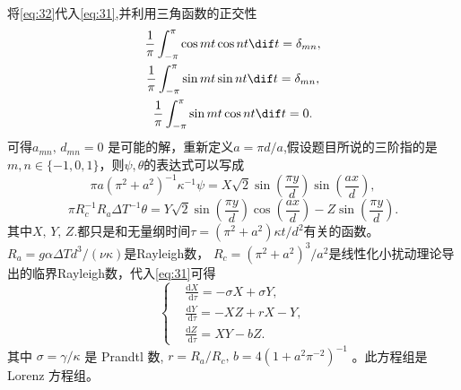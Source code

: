\documentclass[12pt]{ctexart}
\begin{document}
将\cref{eq:32}代入\cref{eq:31},并利用三角函数的正交性
\begin{gather}
	\frac{1}{\pi} \int^\pi_{-\pi} \cos mt \cos nt \dif t = \delta_{mn},\\
	\frac{1}{\pi} \int^\pi_{-\pi} \sin mt \sin nt \dif t = \delta_{mn},\\
	\frac{1}{\pi} \int^\pi_{-\pi} \sin mt \cos nt \dif t = 0.
\end{gather}
可得$a_{mn},\, d_{mn} = 0$ 是可能的解，重新定义$a=\pi d/a$,假设题目所说的三阶指的是$m,n \in \{-1,0,1\}$，则$\psi,\theta$的表达式可以写成\cite[P252]{shi}
\begin{equation}
	\pi a \left(\pi^2+a^2\right)^{-1} \kappa^{-1} \psi = X \sqrt{2} \sin \left(\frac{\pi y}{d}\right) \sin \left(\frac{a x}{d}\right),
	\label{eq:33}
\end{equation}
\begin{equation}
	\pi R_c^{-1}R_a \Delta T^{-1} \theta= Y \sqrt{2} \sin \left(\frac{\pi y}{d}\right) \cos \left(\frac{a x}{d}\right)- Z \sin \left(\frac{\pi y}{d}\right).
	\label{eq:34}
\end{equation}
其中$X,\, Y,\, Z.$都只是和无量纲时间$\tau = (\pi^2 + a^2)\kappa t / d^2$有关的函数。 $R_a = g \alpha \Delta T d^3 / (\nu \kappa)$是Rayleigh数， $R_c = (\pi^2+a^2)^3/a^2$是线性化小扰动理论导出的临界Rayleigh数，代入\cref{eq:31}可得
\begin{equation}
	\left\{
	\begin{aligned}
		 & \frac{\mathrm{d} X}{\mathrm{~d} \tau}=-\sigma X+\sigma Y, \\
		 & \frac{\mathrm{d} Y}{\mathrm{~d} \tau}=-X Z+r X-Y,         \\
		 & \frac{\mathrm{d} Z}{\mathrm{~d} \tau}=X Y-b Z.
	\end{aligned}
	\right.
	\label{eq:3lorenz}
\end{equation}
其中 $\sigma=\gamma / \kappa$ 是 Prandtl 数, $r=R_{a} / R_{c},\, b=4\left(1+a^{2} \pi^{-2}\right)^{-1}$ 。此方程组是 Lorenz 方程组。
\end{document}
